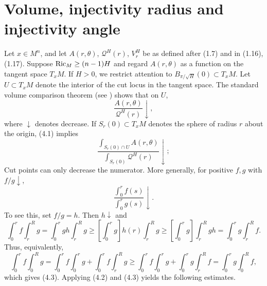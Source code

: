 \chapter{Volume, injectivity radius and injectivity angle}

Let $x\in M^n$, and let $A(r,\theta)$,
$\mathcal{Q}^H(r)$, $V_r^H$ be as defined after (1.7) and in (1.16), (1.17).
Suppose $\operatorname{Ric}_M\geq (n-1)H$ and regard $A(r,\theta)$ as a function on the tangent
space $T_xM$. If $H>0$, we restrict attention to $B_{\pi/\sqrt{H}}(0)\subset T_xM$.
Let $U\subset T_xM$ denote the interior of the cut locus in the tangent space.
The standard volume comparison theorem (see
\cite[pp.~253--257]{cgt-bishop-crittenden}) shows that
on $U$,
\begin{equation}
\tag{4.1}
\frac{A(r,\theta)}{\mathcal{Q}^H(r)}\downarrow,
\end{equation}
where $\downarrow$ denotes decrease. If $S_r(0)\subset T_xM$ denotes the sphere
of radius $r$ about the origin, (4.1) implies
\begin{equation}
\tag{4.2}
\frac{\int_{S_r(0)\cap U} A(r,\theta)}{\int_{S_r(0)} \mathcal{Q}^H(r)}\downarrow;
\end{equation}
Cut points can only decrease the numerator. More generally, for positive $f,g$ with
$f/g\downarrow$,
\begin{equation}
\tag{4.3}
\frac{\int_0^r f(s)}{\int_0^r g(s)}\downarrow.
\end{equation}
To see this, set $f/g=h$. Then $h\downarrow$ and
\begin{equation}
\tag{4.4}
\int_0^r f \int_r^R g
= \int_0^r gh \int_r^R g
\geq \left[\int_0^r g\right] h(r)\int_r^R g
\geq \left[\int_0^r g\right]\int_r^R gh
= \int_0^r g \int_r^R f.
\end{equation}
Thus, equivalently,
\begin{equation}
\tag{4.5}
\int_0^r f \int_0^R g
= \int_0^r f \int_0^r g + \int_0^r f \int_r^R g
\geq \int_0^r f \int_0^r g + \int_0^r g \int_r^R f
= \int_0^r g \int_0^R f,
\end{equation}
which gives (4.3). Applying (4.2) and (4.3) yields the following estimates.

